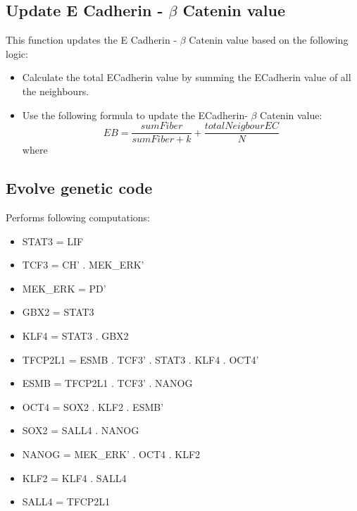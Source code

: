 \documentclass[11pt]{report}
\begin{document}
  \subsection{\color{blue}Update E Cadherin - $ \beta $ Catenin value}
  This function updates the E Cadherin - $ \beta $ Catenin value based on the following logic:
  \begin{itemize}
   \item Calculate the total ECadherin value by summing the ECadherin value of all the neighbours.
   \item Use the following formula to update the ECadherin- $\beta$ Catenin value:\\
   \begin{equation}
    EB = \frac{sumFiber}{sumFiber+k} + \frac{totalNeigbourEC}{N}
   \end{equation}
   where
   \end{itemize}
   \subsection{\color{blue}Evolve genetic code}
   Performs following computations: 
   \begin{itemize}
    \item STAT3 	= 	LIF
    \item TCF3 		= 	CH' . MEK{\_}ERK'
    \item MEK{\_}ERK 	= 	PD'
    \item GBX2		=	STAT3
    \item KLF4		=	STAT3 . GBX2
    \item TFCP2L1	=	ESMB . TCF3' . STAT3 . KLF4 . OCT4'
    \item ESMB		=	TFCP2L1 . TCF3' . NANOG
    \item OCT4		=	SOX2 . KLF2 . ESMB'
    \item SOX2		=	SALL4 . NANOG
    \item NANOG		=	MEK{\_}ERK' . OCT4 . KLF2
    \item KLF2		=	KLF4 . SALL4
    \item SALL4		=	TFCP2L1
   \end{itemize}
\end{document}

